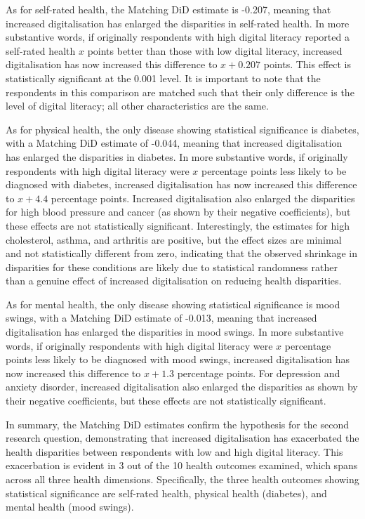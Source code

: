 As for self-rated health, the Matching DiD estimate is -0.207, meaning that increased digitalisation has enlarged the disparities in self-rated health. In more substantive words, if originally respondents with high digital literacy reported a self-rated health $x$ points better than those with low digital literacy, increased digitalisation has now increased this difference to $x + 0.207$ points. This effect is statistically significant at the 0.001 level. It is important to note that the respondents in this comparison are matched such that their only difference is the level of digital literacy; all other characteristics are the same.

As for physical health, the only disease showing statistical significance is diabetes, with a Matching DiD estimate of -0.044, meaning that increased digitalisation has enlarged the disparities in diabetes. In more substantive words, if originally respondents with high digital literacy were $x$ percentage points less likely to be diagnosed with diabetes, increased digitalisation has now increased this difference to $x + 4.4$ percentage points. Increased digitalisation also enlarged the disparities for high blood pressure and cancer (as shown by their negative coefficients), but these effects are not statistically significant. Interestingly, the estimates for high cholesterol, asthma, and arthritis are positive, but the effect sizes are minimal and not statistically different from zero, indicating that the observed shrinkage in disparities for these conditions are likely due to statistical randomness rather than a genuine effect of increased digitalisation on reducing health disparities.

As for mental health, the only disease showing statistical significance is mood swings, with a Matching DiD estimate of -0.013, meaning that increased digitalisation has enlarged the disparities in mood swings. In more substantive words, if originally respondents with high digital literacy were $x$ percentage points less likely to be diagnosed with mood swings, increased digitalisation has now increased this difference to $x + 1.3$ percentage points. For depression and anxiety disorder, increased digitalisation also enlarged the disparities as shown by their negative coefficients, but these effects are not statistically significant.

In summary, the Matching DiD estimates confirm the hypothesis for the second research question, demonstrating that increased digitalisation has exacerbated the health disparities between respondents with low and high digital literacy. This exacerbation is evident in 3 out of the 10 health outcomes examined, which spans across all three health dimensions. Specifically, the three health outcomes showing statistical significance are self-rated health, physical health (diabetes), and mental health (mood swings).
